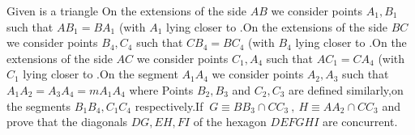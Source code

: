 Given is a triangle On the extensions of the side $AB$ we consider points $A_1,B_1$ such that $AB_1=BA_1$ (with $A_1$ lying closer to .On the extensions of the side $BC$ we consider points $B_4,C_4$ such that $CB_4=BC_4$ (with $B_4$ lying closer to .On the extensions of the side $AC$ we consider points $C_1,A_4$ such that $AC_1=CA_4$ (with $C_1$ lying closer to .On the segment $A_1A_4$ we consider points $A_2,A_3$ such that $A_1A_2=A_3A_4=mA_1A_4$ where Points $B_2,B_3$ and $C_2,C_3$ are defined similarly,on the segments $B_1B_4,C_1C_4$ respectively.If  $\ G\equiv BB_3\cap CC_3 \ , \ H\equiv AA_2\cap CC_3$ and prove that the diagonals $DG,EH,FI$ of the hexagon $DEFGHI$ are concurrent.

